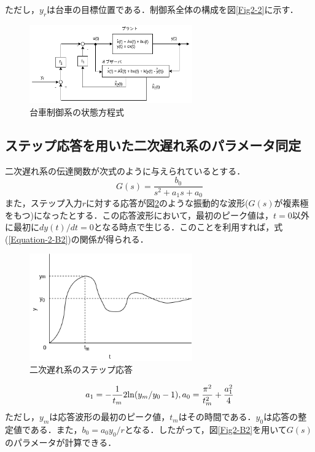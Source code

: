 \documentclass[12pt]{jsarticle}
\begin{document}
ただし，$y_r$は台車の目標位置である．制御系全体の構成を図\ref{Fig2-2}に示す．
\begin{figure}[tb]
  \begin{center}
    \includegraphics[clip,width=7.0cm]{../img/B2-2.png}
    \caption{台車制御系の状態方程式}
    \label{B2-2}
  \end{center}
\end{figure}
\subsection{ステップ応答を用いた二次遅れ系のパラメータ同定}
二次遅れ系の伝達関数が次式のように与えられているとする．
\begin{equation}
  \label{Equation-2-B1}
  G(s) = \frac{b_0}{s^2+a_1s+a_0}
\end{equation}
また，ステップ入力$r$に対する応答が図\ref{Fig2-B1}のような振動的な波形($G(s)$が複素極をもつ)になったとする．この応答波形において，最初のピーク値は，$t=0$以外に最初に$dy(t)/dt = 0$となる時点で生じる．このことを利用すれば，式(\ref{Equation-2-B2})の関係が得られる．
\begin{figure}[tb]
  \begin{center}
    \includegraphics[clip,width=7.0cm]{../img/2-B1.png}
    \caption{二次遅れ系のステップ応答}
    \label{Fig2-B1}
  \end{center}
\end{figure}
\begin{equation}
  \label{Equation-2-B2}
  a_1 = -\frac{1}{t_m}2{\rm ln}(y_m/y_0 -1),  a_0 = \frac{\pi^2}{t_m^2}+\frac{a_1^2}{4}
\end{equation}
ただし，$y_m$は応答波形の最初のピーク値，$t_m$はその時間である．$y_0$は応答の整定値である．また，$b_0=a_0y_0/r$となる．したがって，図\ref{Fig2-B2}を用いて$G(s)$のパラメータが計算できる．
\end{document}
